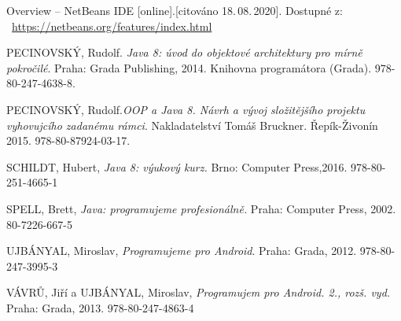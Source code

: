 \documentclass{vskpou} %
\begin{document}
\begin{thebibliography}{9}
 Overview -- NetBeans IDE  [online].[citováno 18.\,08.\,2020]. Dostupné z: ~\url{https://netbeans.org/features/index.html}



 PECINOVSKÝ, Rudolf.\textit{ Java 8: úvod do objektové architektury pro mírně pokročilé}. Praha: Grada Publishing, 2014. Knihovna programátora (Grada). 978-80-247-4638-8.

 PECINOVSKÝ, Rudolf.\textit{OOP a Java 8. Návrh a vývoj složitějšího projektu vyhovujcího zadanému rámci}.  Nakladatelství Tomáš Bruckner. Řepík-Živonín 2015. 978-80-87924-03-17.


 SCHILDT, Hubert, \textit{Java 8: výukový kurz.} Brno: Computer Press,2016. 978-80-251-4665-1

 SPELL, Brett, \textit{Java: programujeme profesionálně.} Praha: Computer Press, 2002. 80-7226-667-5

 UJBÁNYAL, Miroslav, \textit{Programujeme pro Android}. Praha: Grada, 2012. 978-80-247-3995-3

 VÁVRŮ, Jiří a UJBÁNYAL, Miroslav, \textit{Programujem pro Android. 2., rozš. vyd.} Praha: Grada, 2013. 978-80-247-4863-4




\end{thebibliography}


\listoffigures
\listoftables
\end{document}
